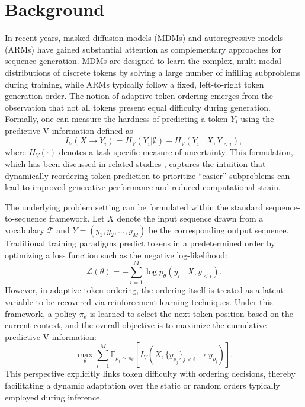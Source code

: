 \documentclass{article} %
\begin{document}
\section{Background}
In recent years, masked diffusion models (MDMs) and autoregressive models (ARMs) have gained substantial attention as complementary approaches for sequence generation. MDMs are designed to learn the complex, multi-modal distributions of discrete tokens by solving a large number of infilling subproblems during training, while ARMs typically follow a fixed, left-to-right token generation order. The notion of adaptive token ordering emerges from the observation that not all tokens present equal difficulty during generation. Formally, one can measure the hardness of predicting a token \( Y_i \) using the predictive V-information defined as 
\[
I_V(X \to Y_i) = H_V(Y_i|\emptyset) - H_V(Y_i \mid X, Y_{<i}),
\]
where \( H_V(\cdot) \) denotes a task-specific measure of uncertainty. This formulation, which has been discussed in related studies \cite{kim2025train, nie2024scaling}, captures the intuition that dynamically reordering token prediction to prioritize “easier” subproblems can lead to improved generative performance and reduced computational strain.

The underlying problem setting can be formulated within the standard sequence-to-sequence framework. Let \( X \) denote the input sequence drawn from a vocabulary \( \mathcal{T} \) and \( Y = (y_1, y_2, \dots, y_M) \) be the corresponding output sequence. Traditional training paradigms predict tokens in a predetermined order by optimizing a loss function such as the negative log-likelihood:
\[
\mathcal{L}(\theta) = -\sum_{i=1}^{M} \log p_\theta(y_i \mid X, y_{<i}).
\]
However, in adaptive token-ordering, the ordering itself is treated as a latent variable to be recovered via reinforcement learning techniques. Under this framework, a policy \( \pi_\theta \) is learned to select the next token position based on the current context, and the overall objective is to maximize the cumulative predictive V-information:
\[
\max_{\theta} \sum_{i=1}^{M} \mathbb{E}_{\rho_i \sim \pi_\theta}\left[ I_V\left(X, \{y_{\rho_j}\}_{j<i} \to y_{\rho_i}\right) \right].
\]
This perspective explicitly links token difficulty with ordering decisions, thereby facilitating a dynamic adaptation over the static or random orders typically employed during inference.
\end{document}
